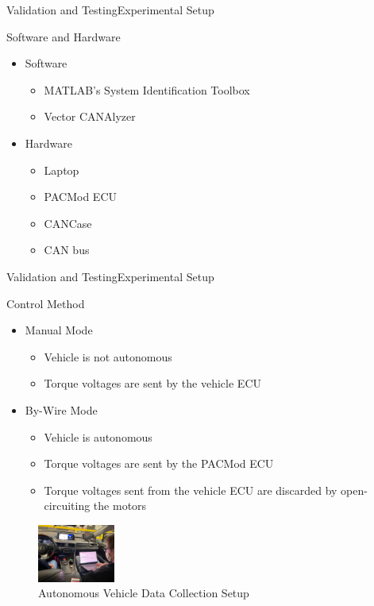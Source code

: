 \documentclass{beamer}
\begin{document}
\begin{frame}{Validation and Testing}{Experimental Setup}
  \begin{block}{Software and Hardware}
 \begin{itemize}
        \item Software
        \begin{itemize}
        \small
        \item MATLAB's System Identification Toolbox
        \item Vector CANAlyzer
        \end{itemize}
	\item Hardware
	\begin{itemize}
	\small
	\item Laptop
	\item PACMod ECU
	\item CANCase 
	\item CAN bus
	\end{itemize}
\end{itemize}
  \end{block}
\end{frame}



\begin{frame}{Validation and Testing}{Experimental Setup}
	\begin{block}{Control Method}
		\begin{itemize}
			\item Manual Mode
			\begin{itemize}
				\item Vehicle is not autonomous
				\item Torque voltages are sent by the vehicle ECU
			\end{itemize}
			\item By-Wire Mode
			\begin{itemize}
				\item Vehicle is autonomous
				\item Torque voltages are sent by the PACMod ECU
				\item Torque voltages sent from the vehicle ECU are discarded by open-circuiting the motors
			\end{itemize}
		\end{itemize}
		\begin{figure}
			\centering
    			\captionsetup{justification=centering, margin=3cm}
    			\includegraphics[width=1in]{figs/img/picturesVisitToAStuff/dataColletionSetup1-20211007}
    			\caption{Autonomous Vehicle Data Collection Setup}
    			\label{fig:vehicleSetup}
		\end{figure}
	\end{block}
\end{frame}
\end{document}
